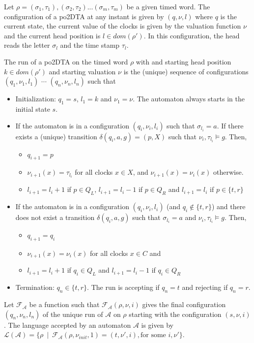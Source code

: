 \documentclass{llncs}
\newcommand{\autm}{\mathcal A}
\begin{document}
\begin{definition}[Run]
Let $\rho = (\sigma_1,\tau_1),(\sigma_2,\tau_2)... (\sigma_m,\tau_m)$ be a given timed word. 
The configuration of a po2DTA at any instant is given by $(q,\nu,l)$ where $q$ is the current state, the current value of the clocks is given by the valuation function $\nu$ and the current head 
position is $l \in dom(\rho')$. In this configuration, the head reads the letter $\sigma_l$ and the time stamp  $\tau_l$.

The run of a po2DTA on the timed word $\rho$ with and starting head position $k\in dom(\rho')$ and starting 
valuation $\nu$ is the (unique) sequence of configurations $(q_1,\nu_1,l_1)$ $\cdots$ $(q_n,\nu_n,l_n)$ such  that
\begin{itemize}
 \item Initialization: $q_1 = s$, $l_1=k$ and $\nu_1 = \nu$. The automaton always starts in the initial
 state $s$.
\item  If the automaton is in a configuration $(q_i,\nu_i,l_i)$ such that $\sigma_{l_i}=a$. If there exists a (unique) transition $\delta(q_i,a,g)=(p,X)$ such that $\nu_i,\tau_{l_i} \models g$. Then,
\begin{itemize}
 \item $q_{i+1}=p$
\item $\nu_{i+1}(x)=\tau_{l_i}$ for all clocks $x\in X$, and $\nu_{i+1}(x)= \nu_i(x)$ otherwise.
\item $l_{i+1} = l_i+1$ if $p\in Q_L$, $l_{i+1} = l_i-1$ if $p\in Q_R$ and $l_{i+1} = l_i$  if $p\in \{t,r\}$
\end{itemize}
\item If the automaton is in a configuration $(q_i,\nu_i,l_i)$ (and $q_i\not\in \{t,r\}$) and there does not exist a transition $\delta(q_i,a,g)$ such that $\sigma_{l_i}=a$ and $\nu_i,\tau_{l_i} \models g$. Then,
\begin{itemize}
 \item $q_{i+1}=q_i$
\item $\nu_{i+1}(x)=\nu_{i}(x)$ for all clocks $x\in C$ and
\item $l_{i+1} = l_i+1$ if $q_i\in Q_L$ and $l_{i+1} = l_i-1$ if $q_i\in Q_R$
\end{itemize}
\item Termination: $q_n\in \{t,r\}$. The run is accepting if $q_n=t$ and rejecting if $q_n=r$.
\end{itemize}
Let $\mathcal F_\autm$ be a function such that $\mathcal F_\autm(\rho,\nu,i)$ gives the final configuration
$(q_n,\nu_n,l_n)$ of the unique run of $\autm$ on $\rho$ starting with the configuration $(s,\nu,i)$.
The language accepted by an automaton $\autm$ is given by 
$\mathcal L(\autm)=\{\rho ~\mid~ \mathcal F_\autm(\rho,\nu_{init},1) = (t,\nu',i), \mbox{for some } i,\nu'\}$. 
\end{definition}
\end{document}
